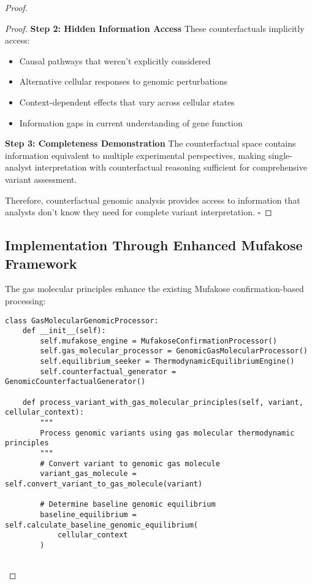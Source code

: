 \documentclass[12pt,a4paper]{article}
\begin{document}
\begin{proof}
\begin{proof}
\textbf{Step 2: Hidden Information Access}
These counterfactuals implicitly access:
\begin{itemize}
\item Causal pathways that weren't explicitly considered
\item Alternative cellular responses to genomic perturbations
\item Context-dependent effects that vary across cellular states
\item Information gaps in current understanding of gene function
\end{itemize}

\textbf{Step 3: Completeness Demonstration}
The counterfactual space contains information equivalent to multiple experimental perspectives, making single-analyst interpretation with counterfactual reasoning sufficient for comprehensive variant assessment.

Therefore, counterfactual genomic analysis provides access to information that analysts don't know they need for complete variant interpretation. $\square$
\end{proof}

\subsection{Implementation Through Enhanced Mufakose Framework}

The gas molecular principles enhance the existing Mufakose confirmation-based processing:

\begin{lstlisting}[style=pythonstyle, caption=Gas Molecular Enhanced Genomic Processing]
class GasMolecularGenomicProcessor:
    def __init__(self):
        self.mufakose_engine = MufakoseConfirmationProcessor()
        self.gas_molecular_processor = GenomicGasMolecularProcessor()
        self.equilibrium_seeker = ThermodynamicEquilibriumEngine()
        self.counterfactual_generator = GenomicCounterfactualGenerator()
        
    def process_variant_with_gas_molecular_principles(self, variant, cellular_context):
        """
        Process genomic variants using gas molecular thermodynamic principles
        """
        # Convert variant to genomic gas molecule
        variant_gas_molecule = self.convert_variant_to_gas_molecule(variant)
        
        # Determine baseline genomic equilibrium
        baseline_equilibrium = self.calculate_baseline_genomic_equilibrium(
            cellular_context
        )
        

\end{lstlisting}
\end{proof}
\end{document}
